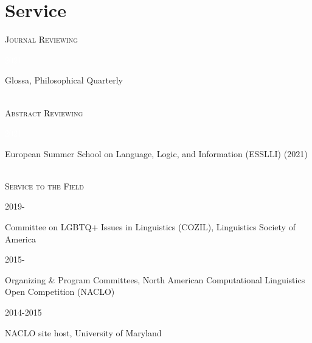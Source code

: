 \documentclass[12pt]{article} %
\begin{document}
\section{Service}

\textsc{Journal Reviewing}\\

\begin{minipage}[t]{3cm}
{\textcolor{white}{2021}}
\end{minipage}
\begin{minipage}[t]{\smallertextwidth} Glossa, Philosophical Quarterly \end{minipage}\\

\textsc{Abstract Reviewing}\\

\begin{minipage}[t]{3cm}
	{\textcolor{white}{2021}}
\end{minipage}
\begin{minipage}[t]{\smallertextwidth} European Summer School on Language, Logic, and Information (ESSLLI) (2021) \end{minipage}\\

\textsc{Service to the Field}\\


\begin{minipage}[t]{3cm}
	2019-
\end{minipage}
\begin{minipage}[t]{\smallertextwidth} Committee on LGBTQ+ Issues in Linguistics (COZIL), Linguistics Society of America \end{minipage}

\vspace{0.1cm}

\begin{minipage}[t]{3cm}
	2015-
\end{minipage}
\begin{minipage}[t]{\smallertextwidth}Organizing \& Program Committees, North American Computational Linguistics Open Competition (NACLO)\end{minipage}

\vspace{0.1cm}

\begin{minipage}[t]{3cm}
	2014-2015
\end{minipage}
\begin{minipage}[t]{\smallertextwidth}NACLO site host, University of Maryland\end{minipage}\\
\end{document}
